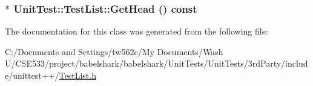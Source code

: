 \hypertarget{class_unit_test_1_1_test_list_86b24d8d8148bc28a596fc6bcc0b478d}{
\subsubsection[{GetHead}]{$\ast$ UnitTest::TestList::GetHead () const}}
\label{class_unit_test_1_1_test_list_86b24d8d8148bc28a596fc6bcc0b478d}




The documentation for this class was generated from the following file:\begin{CompactItemize}
\item 
C:/Documents and Settings/tw562c/My Documents/Wash U/CSE533/project/babelshark/babelshark/UnitTests/UnitTests/3rdParty/include/unittest++/\hyperlink{_test_list_8h}{TestList.h}\end{CompactItemize}

